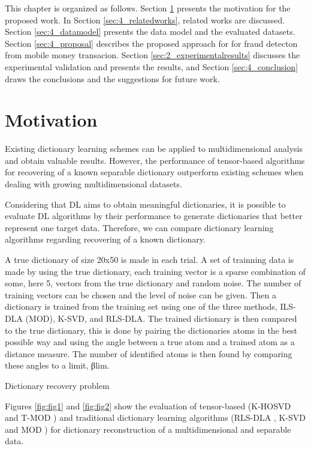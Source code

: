 This chapter is organized as follows. Section \ref{sec:4_motivation} presents the motivation for the proposed work. In Section \ref{sec:4_relatedworks}, related works are discussed. Section \ref{sec:4_datamodel} presents the data model and the evaluated datasets. Section \ref{sec:4_proposal} describes the proposed approach for for fraud detecton from mobile money transacion. Section \ref{sec:2_experimentalresults} discusses the experimental validation and presents the results, and Section \ref{sec:4_conclusion} draws the conclusions and the suggestions for future work.


\section{Motivation}
\label{sec:4_motivation}

Existing dictionary learning schemes can be applied to multidimensional analysis and obtain valuable results. However, the performance of tensor-based algorithms for recovering of a known separable dictionary outperform existing schemes when dealing with growing multidimensional datasets.

Considering that DL aims to obtain meaningful dictionaries, it is possible to evaluate DL algorithms by their performance to generate dictionaries that better represent one target data. Therefore, we can compare dictionary learning algorithms regarding recovering of a known dictionary. 

A true dictionary of size 20x50 is made in each trial. A set of trainning data is made by using the true dictionary, each training vector is a sparse combination of some, here 5, vectors from the true dictionary and random noise. The number of training vectors can be chosen and the level of noise can be given. Then a dictionary is trained from the training set using one of the three methods, ILS-DLA (MOD), K-SVD, and RLS-DLA. The trained dictionary is then compared to the true dictionary, this is done by pairing the dictionaries atoms in the best possible way and using the angle between a true atom and a trained atom as a distance measure. The number of identified atoms is then found by comparing these angles to a limit, βlim.

Dictionary recovery problem

Figures \ref{fig:fig1} and \ref{fig:fig2} show the evaluation of tensor-based (K-HOSVD \cite{roemer2014tensor} and T-MOD \cite{roemer2014tensor}) and traditional dictionary learning algorithms (RLS-DLA \cite{skretting2010recursive}, K-SVD \cite{aharon2006rm} and MOD \cite{engan1999method}) for dictionary reconstruction of a multidimensional and separable data.


